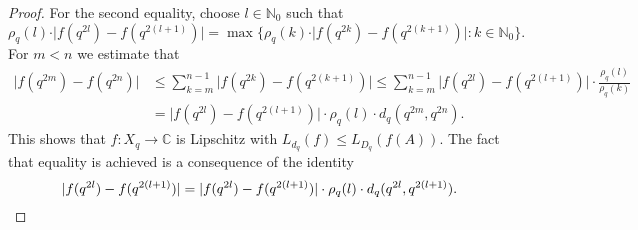 \documentclass[11pt, reqno, a4paper, final]{amsart}
\theoremstyle{plain}
\theoremstyle{definition}
\newcommand{\NN}{{\mathbb N}}
\newcommand{\CC}{{\mathbb C}}
\renewcommand{\leq}{\leqslant}
\newcommand{\black}{\color{black}}
\begin{document}
\begin{proof}
For the second equality, {\black choose $l\in \NN_0$ such that 
\[
\rho_q(l) \cdot \vert f(q^{2l})- f(q^{2(l+1)}) \vert 
= \max \lbrace \rho_q(k) \cdot \vert f(q^{2k})-f(q^{2(k+1)}) \vert : k \in \NN_0 \rbrace .
\]
For $m<n$ we estimate that
\begin{equation}\label{eq:finest}
\begin{split}
\vert f(q^{2m}) - f(q^{2n}) \vert & \leq \sum_{k = m}^{n-1} \vert f(q^{2k}) - f(q^{2(k+1)}) \vert  
\leq \sum_{k = m}^{n-1} \vert f(q^{2l}) - f(q^{2(l+1)}) \vert \cdot \frac{\rho_q(l)}{\rho_q(k)} \\
& = \vert f(q^{2l}) - f(q^{2(l+1)}) \vert \cdot \rho_q(l) \cdot d_q( q^{2m},q^{2n}) .
\end{split}
\end{equation}
This shows that $f : X_q \to \CC$ is Lipschitz with $L_{d_q}(f) \leq L_{D_q}(f(A))$. The fact that equality is achieved is a consequence of the identity
\[
\vert f(q^{2l}) - f(q^{2(l+1)}) \vert = \vert f(q^{2l}) - f(q^{2(l+1)}) \vert \cdot \rho_q(l) \cdot d_q( q^{2l},q^{2(l+1)}) . \qedhere
\] }
\end{proof}
\end{document}
